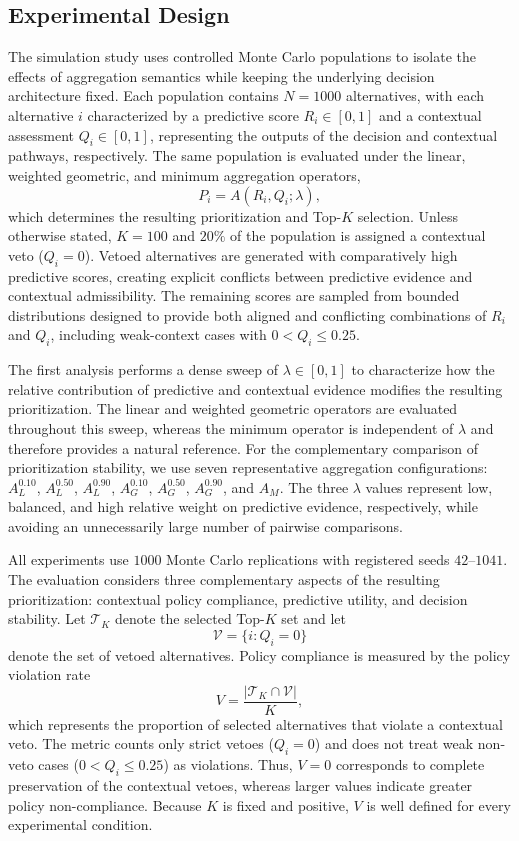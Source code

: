 \documentclass[mathematics,article,submit,moreauthors]{Definitions/mdpi}
\begin{document}
\subsection{Experimental Design}
\label{subsec:experimental-design}

The simulation study uses controlled Monte Carlo populations to isolate the
effects of aggregation semantics while keeping the underlying decision
architecture fixed. Each population contains $N=1000$ alternatives, with each
alternative $i$ characterized by a predictive score $R_i\in[0,1]$ and a
contextual assessment $Q_i\in[0,1]$, representing the outputs of the
decision and contextual pathways, respectively. The same population is
evaluated under the linear, weighted geometric, and minimum aggregation
operators,
\[
P_i=A(R_i,Q_i;\lambda),
\]
which determines the resulting prioritization and Top-$K$ selection. Unless
otherwise stated, $K=100$ and $20\%$ of the population is assigned a
contextual veto ($Q_i=0$). Vetoed alternatives are generated with
comparatively high predictive scores, creating explicit conflicts between
predictive evidence and contextual admissibility. The remaining scores are
sampled from bounded distributions designed to provide both aligned and
conflicting combinations of $R_i$ and $Q_i$, including weak-context cases
with $0<Q_i\leq0.25$.

The first analysis performs a dense sweep of $\lambda\in[0,1]$ to
characterize how the relative contribution of predictive and contextual
evidence modifies the resulting prioritization. The linear and weighted
geometric operators are evaluated throughout this sweep, whereas the
minimum operator is independent of $\lambda$ and therefore provides a
natural reference. For the complementary comparison of prioritization
stability, we use seven representative aggregation configurations:
$A_L^{0.10}$, $A_L^{0.50}$, $A_L^{0.90}$,
$A_G^{0.10}$, $A_G^{0.50}$, $A_G^{0.90}$, and $A_M$.
The three $\lambda$ values represent low, balanced, and high relative weight
on predictive evidence, respectively, while avoiding an unnecessarily large
number of pairwise comparisons.

All experiments use $1000$ Monte Carlo replications with registered seeds
$42$--$1041$. The evaluation considers three complementary aspects of the
resulting prioritization: contextual policy compliance, predictive utility,
and decision stability. Let $\mathcal{T}_K$ denote the selected Top-$K$ set
and let
\[
\mathcal{V}=\{i:Q_i=0\}
\]
denote the set of vetoed alternatives. Policy compliance is measured by the
policy violation rate
\[
V=\frac{|\mathcal{T}_K\cap\mathcal{V}|}{K},
\]
which represents the proportion of selected alternatives that violate a
contextual veto. The metric counts only strict vetoes ($Q_i=0$) and does not
treat weak non-veto cases ($0<Q_i\leq0.25$) as violations. Thus, $V=0$
corresponds to complete preservation of the contextual vetoes, whereas larger
values indicate greater policy non-compliance. Because $K$ is fixed and
positive, $V$ is well defined for every experimental condition.
\end{document}
